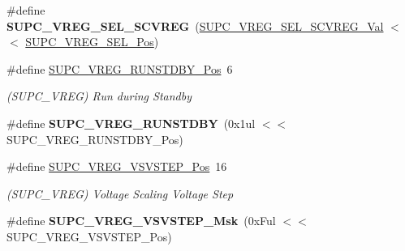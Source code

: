 \begin{DoxyCompactItemize}
\item 
\hypertarget{group___s_a_m_l21___s_u_p_c_ga06456e93d14d1bdc6cc5a199db63d569}{}\#define {\bfseries S\+U\+P\+C\+\_\+\+V\+R\+E\+G\+\_\+\+S\+E\+L\+\_\+\+S\+C\+V\+R\+E\+G}~(\hyperlink{group___s_a_m_l21___s_u_p_c_gaa17ad97cd23fced053de56b11a02c09e}{S\+U\+P\+C\+\_\+\+V\+R\+E\+G\+\_\+\+S\+E\+L\+\_\+\+S\+C\+V\+R\+E\+G\+\_\+\+Val}      $<$$<$ \hyperlink{group___s_a_m_l21___s_u_p_c_gaef51119ae72407e4a6761def82082aad}{S\+U\+P\+C\+\_\+\+V\+R\+E\+G\+\_\+\+S\+E\+L\+\_\+\+Pos})\label{group___s_a_m_l21___s_u_p_c_ga06456e93d14d1bdc6cc5a199db63d569}

\item 
\hypertarget{group___s_a_m_l21___s_u_p_c_ga1b6dc2a782add0cbbc131affbb447a8f}{}\#define \hyperlink{group___s_a_m_l21___s_u_p_c_ga1b6dc2a782add0cbbc131affbb447a8f}{S\+U\+P\+C\+\_\+\+V\+R\+E\+G\+\_\+\+R\+U\+N\+S\+T\+D\+B\+Y\+\_\+\+Pos}~6\label{group___s_a_m_l21___s_u_p_c_ga1b6dc2a782add0cbbc131affbb447a8f}

\begin{DoxyCompactList}\small\item\em (S\+U\+P\+C\+\_\+\+V\+R\+E\+G) Run during Standby \end{DoxyCompactList}\item 
\hypertarget{group___s_a_m_l21___s_u_p_c_ga0fd924073712d29010245683628db788}{}\#define {\bfseries S\+U\+P\+C\+\_\+\+V\+R\+E\+G\+\_\+\+R\+U\+N\+S\+T\+D\+B\+Y}~(0x1ul $<$$<$ S\+U\+P\+C\+\_\+\+V\+R\+E\+G\+\_\+\+R\+U\+N\+S\+T\+D\+B\+Y\+\_\+\+Pos)\label{group___s_a_m_l21___s_u_p_c_ga0fd924073712d29010245683628db788}

\item 
\hypertarget{group___s_a_m_l21___s_u_p_c_ga731992afd40f5c78f4ff7843020a6f66}{}\#define \hyperlink{group___s_a_m_l21___s_u_p_c_ga731992afd40f5c78f4ff7843020a6f66}{S\+U\+P\+C\+\_\+\+V\+R\+E\+G\+\_\+\+V\+S\+V\+S\+T\+E\+P\+\_\+\+Pos}~16\label{group___s_a_m_l21___s_u_p_c_ga731992afd40f5c78f4ff7843020a6f66}

\begin{DoxyCompactList}\small\item\em (S\+U\+P\+C\+\_\+\+V\+R\+E\+G) Voltage Scaling Voltage Step \end{DoxyCompactList}\item 
\hypertarget{group___s_a_m_l21___s_u_p_c_ga7ff6379214011f9cf6f0cfabe547ee7a}{}\#define {\bfseries S\+U\+P\+C\+\_\+\+V\+R\+E\+G\+\_\+\+V\+S\+V\+S\+T\+E\+P\+\_\+\+Msk}~(0x\+Ful $<$$<$ S\+U\+P\+C\+\_\+\+V\+R\+E\+G\+\_\+\+V\+S\+V\+S\+T\+E\+P\+\_\+\+Pos)\label{group___s_a_m_l21___s_u_p_c_ga7ff6379214011f9cf6f0cfabe547ee7a}


\end{DoxyCompactItemize}
